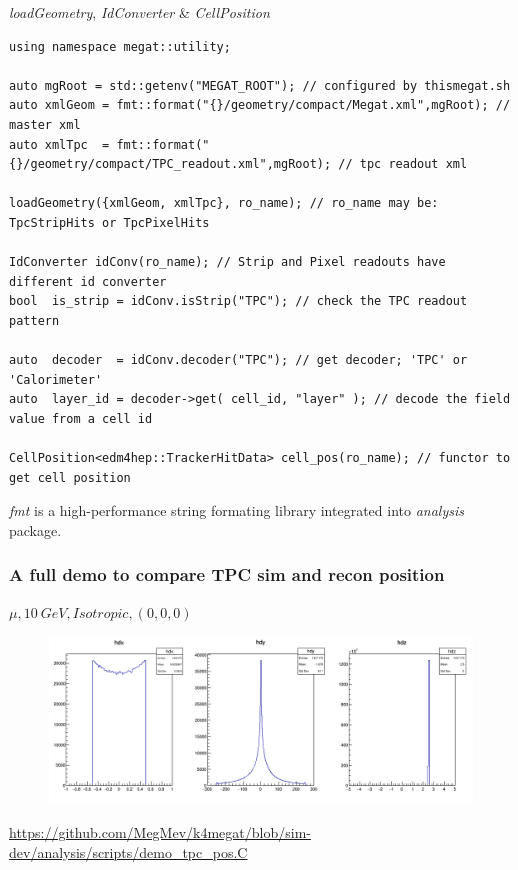 \documentclass[11pt,t,aspectratio=169]{beamer}
\begin{document}
\begin{frame}[fragile]{\textit{loadGeometry}, \textit{IdConverter} \& \textit{CellPosition}}
\begin{block}{}
\begin{verbatim}
using namespace megat::utility;

auto mgRoot = std::getenv("MEGAT_ROOT"); // configured by thismegat.sh
auto xmlGeom = fmt::format("{}/geometry/compact/Megat.xml",mgRoot); // master xml
auto xmlTpc  = fmt::format("{}/geometry/compact/TPC_readout.xml",mgRoot); // tpc readout xml

loadGeometry({xmlGeom, xmlTpc}, ro_name); // ro_name may be: TpcStripHits or TpcPixelHits

IdConverter idConv(ro_name); // Strip and Pixel readouts have different id converter
bool  is_strip = idConv.isStrip("TPC"); // check the TPC readout pattern

auto  decoder  = idConv.decoder("TPC"); // get decoder; 'TPC' or 'Calorimeter'
auto  layer_id = decoder->get( cell_id, "layer" ); // decode the field value from a cell id

CellPosition<edm4hep::TrackerHitData> cell_pos(ro_name); // functor to get cell position
\end{verbatim}
\end{block}
\vfill
\textit{fmt} is a high-performance string formating library integrated into
\textit{analysis} package.
\end{frame}

\begin{frame}[c]
  \frametitle{A full demo to compare TPC sim and recon position}
  $\mu,\SI{10}{GeV}, Isotropic, (0,0,0)$
  \begin{figure}[h!]
    \centering
    \includegraphics[width=\textwidth]{check_pos.png}
  \end{figure}
  \href{https://github.com/MegMev/k4megat/blob/sim-dev/analysis/scripts/demo_tpc_pos.C}{https://github.com/MegMev/k4megat/blob/sim-dev/analysis/scripts/demo\_tpc\_pos.C}
\end{frame}
\end{document}
